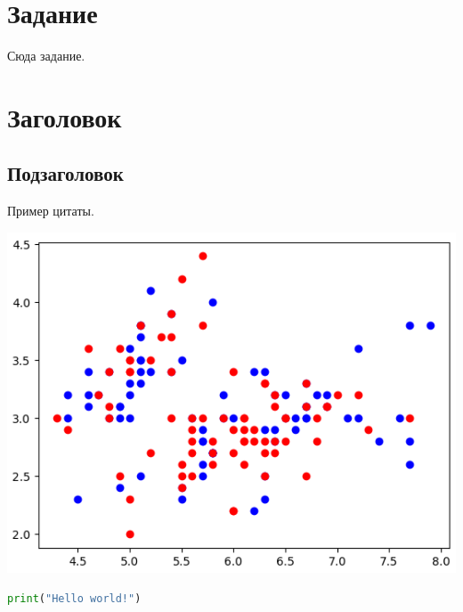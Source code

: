 \documentclass[a4paper, 12pt]{article}
\begin{document}

\pagebreak
\tableofcontents
\newpage
\section*{Задание}
Сюда задание.

\newpage
\section{Заголовок}
\subsection{Подзаголовок}
Пример цитаты.\cite{ALT}
\begin{center}
    \centering
    \includegraphics[width=.7\linewidth]{includes/output.png}
    \label{fig:prplot}
\end{center}
\begin{lstlisting}[language=Python, caption=листинг]
    print("Hello world!")
\end{lstlisting}


\newpage

\end{document}
